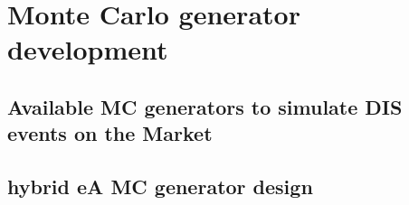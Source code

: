 \chapter{Monte Carlo generator development} \label{chp:MC}

\section{Available MC generators to simulate DIS events on the Market}

\section{hybrid eA MC generator design}